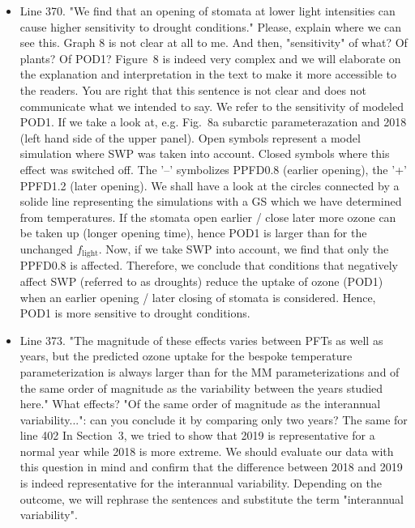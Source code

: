\documentclass{scrartcl}
\begin{document}
\begin{itemize}
\item {\color{blue}Line 370. "We find that an opening of stomata at lower light intensities can cause higher sensitivity to drought conditions." Please, explain where we can see this. Graph 8 is not clear at all to me. And then, "sensitivity" of what? Of plants? Of POD1?}
Figure~8 is indeed very complex and we will elaborate on the explanation and interpretation in the text to make it more accessible to the readers. You are right that this sentence is not clear and does not communicate what we intended to say. We refer to the sensitivity of modeled POD1. If we take a look at, e.g. Fig.~8a subarctic parameterazation and 2018 (left hand side of the upper panel). Open symbols represent a model simulation where SWP was taken into account. Closed symbols where this effect was switched off. The '--' symbolizes PPFD0.8 (earlier opening), the '+' PPFD1.2 (later opening). We shall have a look at the circles connected by a solide line representing the simulations with a GS which we have determined from temperatures. If the stomata open earlier / close later more ozone can be taken up (longer opening time), hence POD1 is larger than for the unchanged $f_\mathrm{light}$. Now, if we take SWP into account, we find that only the PPFD0.8 is affected. Therefore, we conclude that conditions that negatively affect SWP (referred to as droughts) reduce the uptake of ozone (POD1) when an earlier opening / later closing of stomata is considered. Hence, POD1 is more sensitive to drought conditions.

\item {\color{blue}Line 373. "The magnitude of these effects varies between PFTs as well as years, but the predicted ozone uptake for the bespoke temperature parameterization is always larger than for the MM parameterizations and of the same order of magnitude as the variability between the years studied here."
What effects? "Of the same order of magnitude as the interannual variability...": can you conclude it by comparing only two years? The same for line 402}
In Section~3, we tried to show that 2019 is representative for a normal year while 2018 is more extreme. We should evaluate our data with this question in mind and confirm that the difference between 2018 and 2019 is indeed representative for the interannual variability. Depending on the outcome, we will rephrase the sentences and substitute the term "interannual variability".


\end{itemize}
\end{document}
